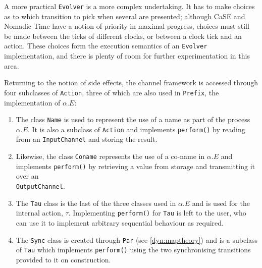A more practical \texttt{Evolver} is a more complex undertaking.  It
has to make choices as to which transition to pick when several are
presented; although CaSE and Nomadic Time have a notion of priority in
maximal progress, choices must still be made between the ticks of
different clocks, or between a clock tick and an action.  These
choices form the execution semantics of an \texttt{Evolver}
implementation, and there is plenty of room for further
experimentation in this area.

Returning to the notion of side effects, the channel framework is
accessed through four subclasses of \texttt{Action}, three of which
are also used in \texttt{Prefix}, the implementation of $\alpha.E$:

\begin{enumerate}
\item The class \texttt{Name} is used to represent the use of a name
  as part of the process $\alpha.E$.  It is also a subclass of
  \texttt{Action} and implements \texttt{perform()} by reading from an
  \texttt{InputChannel} and storing the result.
\item Likewise, the class \texttt{Coname} represents the use of a
  co-name in $\alpha.E$ and implements \texttt{perform()} by
  retrieving a value from storage and transmitting it over an \\
  \texttt{OutputChannel}.
\item The \texttt{Tau} class is the last of the three classes used in
  $\alpha.E$ and is used for the internal action, $\tau$.
  Implementing \texttt{perform()} for \texttt{Tau} is left to the
  user, who can use it to implement arbitrary sequential behaviour as
  required.
\item The \texttt{Sync} class is created through \texttt{Par} (see
  \ref{dyn:maptheory}) and is a subclass of \texttt{Tau} which
  implements \texttt{perform()} using the two synchronising
  transitions provided to it on construction.
\end{enumerate}

